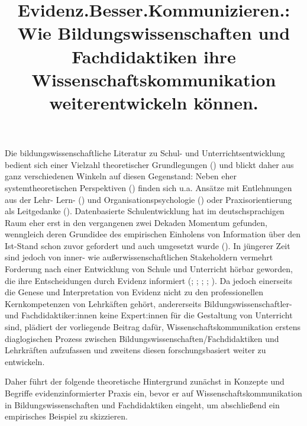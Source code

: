 \documentclass[
  jou,
  floatsintext,
  longtable,
  nolmodern,
  notxfonts,
  notimes,
  colorlinks=true,linkcolor=blue,citecolor=blue,urlcolor=blue]{apa7}
\title{Evidenz.Besser.Kommunizieren.: Wie Bildungswissenschaften und
Fachdidaktiken ihre Wissenschaftskommunikation weiterentwickeln können.}
\begin{document}
\maketitle


\setcounter{secnumdepth}{-\maxdimen} %

\setlength\LTleft{0pt}


Die bildungswissenschaftliche Literatur zu Schul- und
Unterrichtsentwicklung bedient sich einer Vielzahl theoretischer
Grundlegungen () und blickt daher aus
ganz verschiedenen Winkeln auf diesen Gegenstand: Neben eher
systemtheoretischen Perspektiven () finden sich u.a. Ansätze mit Entlehnungen aus der Lehr-
Lern- () und
Organisationspsychologie () oder Praxisorientierung als Leitgedanke
(). Datenbasierte
Schulentwicklung hat im deutschsprachigen Raum eher erst in den
vergangenen zwei Dekaden Momentum gefunden, wenngleich deren Grundidee
des empirischen Einholens von Information über den Ist-Stand schon zuvor
gefordert und auch umgesetzt wurde
(). In jüngerer
Zeit sind jedoch von inner- wie außerwissenschaftlichen Stakeholdern
vermehrt Forderung nach einer Entwicklung von Schule und Unterricht
hörbar geworden, die ihre Entscheidungen durch Evidenz informiert
(; ; ; ; ). Da jedoch einerseits
die Genese und Interpretation von Evidenz nicht zu den professionellen
Kernkompetenzen von Lehrkäften gehört, andererseits
Bildungswissenschaftler- und Fachdidaktiker:innen keine Expert:innen für
die Gestaltung von Unterricht sind, plädiert der vorliegende Beitrag
dafür, Wissenschaftskommunikation erstens diaglogischen Prozess zwischen
Bildungswissenschaften/Fachdidaktiken und Lehrkräften aufzufassen und
zweitens diesen forschungsbasiert weiter zu entwickeln.

Daher führt der folgende theoretische Hintergrund zunächst in Konzepte
und Begriffe evidenzinformierter Praxis ein, bevor er auf
Wissenschaftskommunikation in Bildungswissenschaften und Fachdidaktiken
eingeht, um abschließend ein empirisches Beispiel zu skizzieren.
\end{document}
